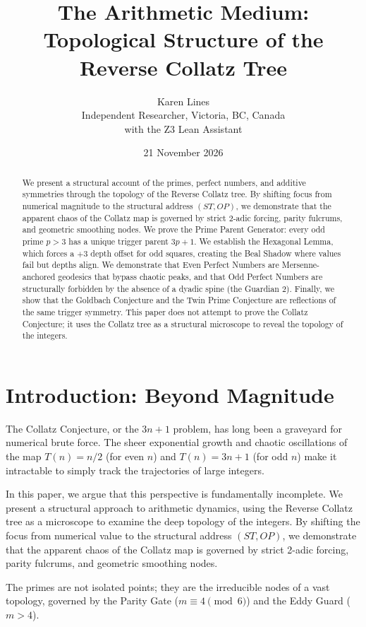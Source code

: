 \documentclass[11pt]{article}
\title{\textbf{The Arithmetic Medium:}\\[4pt]
       \large Topological Structure of the Reverse Collatz Tree}
\author{Karen Lines\\[2pt]
        \small Independent Researcher, Victoria, BC, Canada\\
        \small with the Z3 Lean Assistant}
\date{21 November 2026}
\theoremstyle{definition}
\theoremstyle{remark}
\begin{document}
\maketitle

\begin{abstract}
We present a structural account of the primes, perfect numbers, and additive symmetries through the topology of the Reverse Collatz tree. By shifting focus from numerical magnitude to the structural address \((ST, OP)\), we demonstrate that the apparent chaos of the Collatz map is governed by strict 2-adic forcing, parity fulcrums, and geometric smoothing nodes. We prove the Prime Parent Generator: every odd prime \(p > 3\) has a unique trigger parent \(3p+1\). We establish the Hexagonal Lemma, which forces a \(+3\) depth offset for odd squares, creating the Beal Shadow where values fail but depths align. We demonstrate that Even Perfect Numbers are Mersenne-anchored geodesics that bypass chaotic peaks, and that Odd Perfect Numbers are structurally forbidden by the absence of a dyadic spine (the Guardian \(2\)). Finally, we show that the Goldbach Conjecture and the Twin Prime Conjecture are reflections of the same trigger symmetry. This paper does not attempt to prove the Collatz Conjecture; it uses the Collatz tree as a structural microscope to reveal the topology of the integers.
\end{abstract}

\section{Introduction: Beyond Magnitude}

The Collatz Conjecture, or the \(3n+1\) problem, has long been a graveyard for numerical brute force. The sheer exponential growth and chaotic oscillations of the map \(T(n) = n/2\) (for even \(n\)) and \(T(n) = 3n+1\) (for odd \(n\)) make it intractable to simply track the trajectories of large integers. 

In this paper, we argue that this perspective is fundamentally incomplete. We present a structural approach to arithmetic dynamics, using the Reverse Collatz tree as a microscope to examine the deep topology of the integers. By shifting the focus from numerical value to the structural address \((ST, OP)\), we demonstrate that the apparent chaos of the Collatz map is governed by strict 2-adic forcing, parity fulcrums, and geometric smoothing nodes.

The primes are not isolated points; they are the irreducible nodes of a vast topology, governed by the Parity Gate (\(m \equiv 4 \pmod 6\)) and the Eddy Guard (\(m > 4\)).
\end{document}
